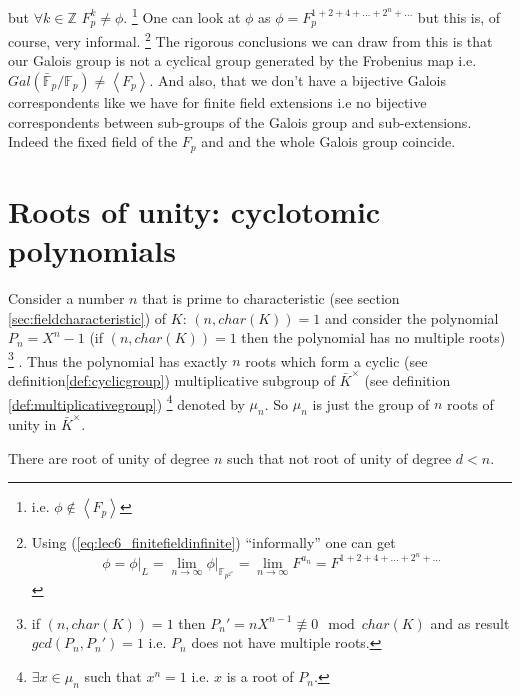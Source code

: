but $\forall k \in \mathbb{Z}$ $F_p^k \ne \phi$.
\footnote{
  i.e. $\phi \notin \left<F_p\right>$
}
One can look at
$\phi$ as $\phi = F_p^{1+2+4+ \dots + 2^n + \dots}$ but this is, of
course, very informal.
\footnote{
  Using (\ref{eq:lec6_finitefieldinfinite}) ``informally'' one can get
  \[
  \phi = \left.\phi\right|_L =
  \lim_{n \to \infty}\left.\phi\right|_{\mathbb{F}_{p^{2^n}}} =
  \lim_{n \to \infty} F^{a_n} = 
  F^{1
    +2 +4 + \dots + 2^n + \dots}
  \]  
}
The rigorous conclusions we can draw from this
is that our Galois group is not a cyclical group generated by the
Frobenius map i.e.
$Gal\left(\bar{\mathbb{F}}_p/\mathbb{F}_p\right) \ne
\left<F_p\right>$. And also, that we don't have a bijective Galois
correspondents like we have for finite field extensions i.e no
bijective correspondents  between sub-groups 
of the Galois group and sub-extensions. Indeed the fixed field of the
$F_p$ and and the whole Galois group coincide.  

\section{ Roots of unity: cyclotomic polynomials}
Consider a number $n$ that is prime to characteristic (see section
\ref{sec:fieldcharacteristic}) of $K$:
$\left(n, char\left(K\right)\right) = 1$ and consider the polynomial
$P_n = X^n - 1$ (if $\left(n, char\left(K\right)\right) = 1$
then the
polynomial has no multiple roots)
\footnote{
 if $\left(n, char\left(K\right)\right) = 1$ then $P_n' = n X^{n-1}
 \not \equiv 0 \mod char\left(K\right)$ and as result
 $gcd\left(P_n, P_n'\right) = 1$ i.e. $P_n$ does not have multiple
 roots. 
}
. Thus the polynomial has exactly $n$
roots which form a cyclic (see definition\ref{def:cyclicgroup})
multiplicative subgroup of $\bar{K}^\times$ 
(see definition \ref{def:multiplicativegroup})
\footnote{
  $\exists x \in \mu_n$ such that $x^n = 1$ i.e. $x$ is a root of $P_n$.
}
denoted by $\mu_n$. So $\mu_n$ is just the group of $n$ roots of unity
in $\bar{K}^\times$.

\begin{definition}
  There are root of unity of degree $n$ such that not root of unity of
  degree $d < n$.
  \label{def:primitiverootsofunity}
\end{definition}

